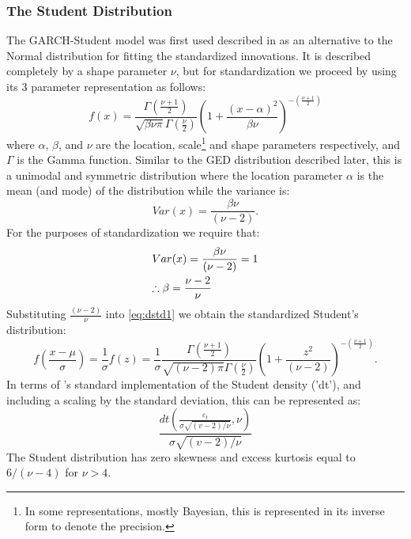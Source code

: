 \subsubsection{The Student Distribution}\label{tdist}
The GARCH-Student model was first used described in \cite{Bollerslev1987} as an
alternative to the Normal distribution for fitting the standardized innovations.
It is described completely by a shape parameter $\nu$, but for standardization
we proceed by using its 3 parameter representation as follows:
\begin{equation}\label{eq:dstd1}
f\left( x \right) = \frac{{\Gamma \left( {\frac{{\nu  + 1}}
{2}} \right)}}
{{\sqrt {\beta \nu \pi } \Gamma \left( {\frac{\nu }
{2}} \right)}}{\left( {1 + \frac{{{{\left( {x - \alpha } \right)}^2}}}
{{\beta \nu }}} \right)^{ - \left( {\frac{{\nu  + 1}}
{2}} \right)}}
\end{equation}
where $\alpha$, $\beta$, and $\nu$ are the location, scale\footnote{In some representations,
mostly Bayesian, this is represented in its inverse form to denote the precision.}
and shape parameters respectively, and $\Gamma$ is the Gamma function. Similar to
the GED distribution described later, this is a unimodal and symmetric distribution
where the location parameter $\alpha$ is the mean (and mode) of the distribution
while the variance is:
\begin{equation}\label{eq:dstd2}
Var\left( x \right) = \frac{{\beta \nu }}{{\left( {\nu  - 2} \right)}}.
\end{equation}
For the purposes of standardization we require that:
\begin{equation}\label{eq:dstd3}
\begin{gathered}
  Var(x) = \frac{{\beta \nu }}
{{\left( {\nu  - 2} \right)}} = 1 \hfill \\
  \therefore \beta  = \frac{{\nu  - 2}}
{\nu } \hfill \\
\end{gathered}
\end{equation}
Substituting $\frac{(\nu- 2)}{\nu }$ into \ref{eq:dstd1} we obtain the
standardized Student's distribution:
\begin{equation}\label{eq:dstd4}
f\left( {\frac{{x - \mu }}{\sigma }} \right) = \frac{1}
{\sigma }f\left( z \right) = \frac{1}
{\sigma }\frac{{\Gamma \left( {\frac{{\nu  + 1}}
{2}} \right)}}{{\sqrt {\left( {\nu  - 2} \right)\pi } \Gamma \left( {\frac{\nu }
{2}} \right)}}{\left( {1 + \frac{{{z^2}}}
{{\left( {\nu  - 2} \right)}}} \right)^{ - \left( {\frac{{\nu  + 1}}
{2}} \right)}}.
\end{equation}
In terms of \verb@R@'s standard implementation of the Student density ('dt'),
and including a scaling by the standard deviation, this can be represented as:
\begin{equation}\label{eq:dstd5}
\frac{{dt\left( {\frac{{{\varepsilon _t}}}
{{\sigma \sqrt {\left( {v - 2} \right)/\nu } }},\nu } \right)}}
{{\sigma \sqrt {\left( {v - 2} \right)/\nu } }}
\end{equation}
The Student distribution has zero skewness and excess kurtosis equal to
$6/(\nu  - 4)$ for $\nu > 4$.

